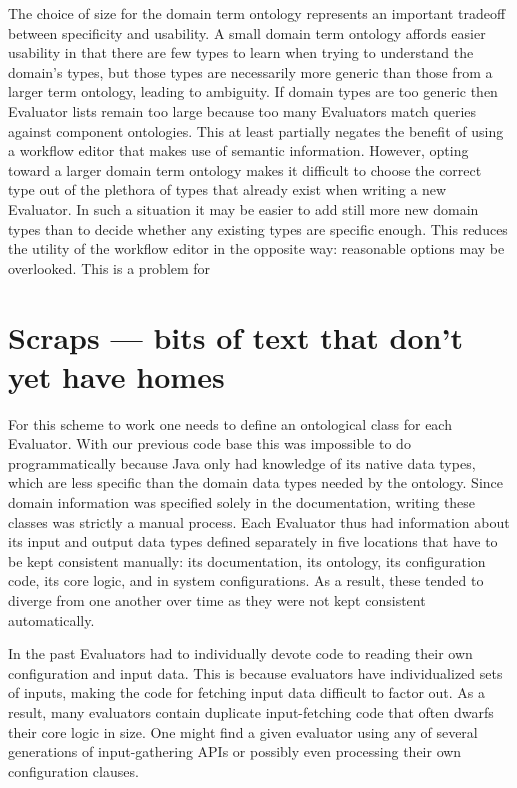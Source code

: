 \documentclass{article}
\begin{document}
The choice of size for the domain term ontology represents an important tradeoff between specificity and usability.
A small domain term ontology affords easier usability in that there are few types to learn when trying to understand the domain's types, but those types are necessarily more generic than those from a larger term ontology, leading to ambiguity.
If domain types are too generic then Evaluator lists remain too large because too many Evaluators match queries against component ontologies.
This at least partially negates the benefit of using a workflow editor that makes use of semantic information.
However, opting toward a larger domain term ontology makes it difficult to choose the correct type out of the plethora of types that already exist when writing a new Evaluator.
In such a situation it may be easier to add still more new domain types than to decide whether any existing types are specific enough.
This reduces the utility of the workflow editor in the opposite way:  reasonable options may be overlooked.
This is a problem for %

\section{Scraps --- bits of text that don't yet have homes} %

For this scheme to work one needs to define an ontological class for each Evaluator.  With our previous code base this was impossible to do programmatically because Java only had knowledge of its native data types, which are less specific than the domain data types needed by the ontology.  Since domain information was specified solely in the documentation, writing these classes was strictly a manual process.
Each Evaluator thus had information about its input and output data types defined separately in five locations that have to be kept consistent manually:  its documentation, its ontology, its configuration code, its core logic, and in system configurations.  As a result, these tended to diverge from one another over time as they were not kept consistent automatically.

In the past Evaluators had to individually devote code to reading their own configuration and input data.  This is because evaluators have individualized sets of inputs, making the code for fetching input data difficult to factor out.  As a result, many evaluators contain duplicate input-fetching code that often dwarfs their core logic in size.  One might find a given evaluator using any of several generations of input-gathering APIs or possibly even processing their own configuration clauses.
\end{document}
